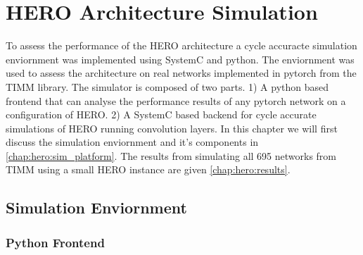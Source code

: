 
\chapter{HERO Architecture Simulation}
\label{chap:results}

To assess the performance of the HERO architecture a cycle accuracte simulation
enviornment was implemented using SystemC and python. The enviornment was used
to assess the architecture on real networks implemented in pytorch from the TIMM
library. The simulator is composed of two parts. 1) A python based frontend that
can analyse the performance results of any pytorch network on a configuration of
HERO. 2) A SystemC based backend for cycle accurate simulations of HERO running
convolution layers. In this chapter we will first discuss the simulation
enviornment and it's components in \autoref{chap:hero:sim_platform}. The results
from simulating all 695 networks from TIMM using a small HERO instance are given
\autoref{chap:hero:results}.

\section{Simulation Enviornment}
\label{chap:hero:sim_platform}

\subsection{Python Frontend}
\label{chap:hero:sim_platform:frontend}

